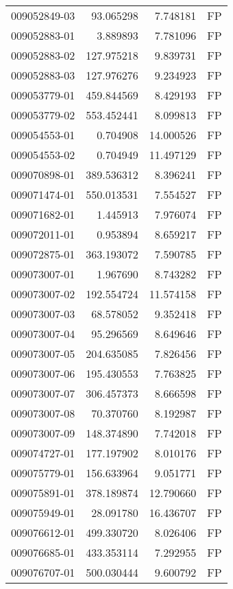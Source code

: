 \begin{tabular}{lrrl}
009052849-03 &   93.065298 &     7.748181 &   FP \\
009052883-01 &    3.889893 &     7.781096 &   FP \\
009052883-02 &  127.975218 &     9.839731 &   FP \\
009052883-03 &  127.976276 &     9.234923 &   FP \\
009053779-01 &  459.844569 &     8.429193 &   FP \\
009053779-02 &  553.452441 &     8.099813 &   FP \\
009054553-01 &    0.704908 &    14.000526 &   FP \\
009054553-02 &    0.704949 &    11.497129 &   FP \\
009070898-01 &  389.536312 &     8.396241 &   FP \\
009071474-01 &  550.013531 &     7.554527 &   FP \\
009071682-01 &    1.445913 &     7.976074 &   FP \\
009072011-01 &    0.953894 &     8.659217 &   FP \\
009072875-01 &  363.193072 &     7.590785 &   FP \\
009073007-01 &    1.967690 &     8.743282 &   FP \\
009073007-02 &  192.554724 &    11.574158 &   FP \\
009073007-03 &   68.578052 &     9.352418 &   FP \\
009073007-04 &   95.296569 &     8.649646 &   FP \\
009073007-05 &  204.635085 &     7.826456 &   FP \\
009073007-06 &  195.430553 &     7.763825 &   FP \\
009073007-07 &  306.457373 &     8.666598 &   FP \\
009073007-08 &   70.370760 &     8.192987 &   FP \\
009073007-09 &  148.374890 &     7.742018 &   FP \\
009074727-01 &  177.197902 &     8.010176 &   FP \\
009075779-01 &  156.633964 &     9.051771 &   FP \\
009075891-01 &  378.189874 &    12.790660 &   FP \\
009075949-01 &   28.091780 &    16.436707 &   FP \\
009076612-01 &  499.330720 &     8.026406 &   FP \\
009076685-01 &  433.353114 &     7.292955 &   FP \\
009076707-01 &  500.030444 &     9.600792 &   FP \\

\end{tabular}
